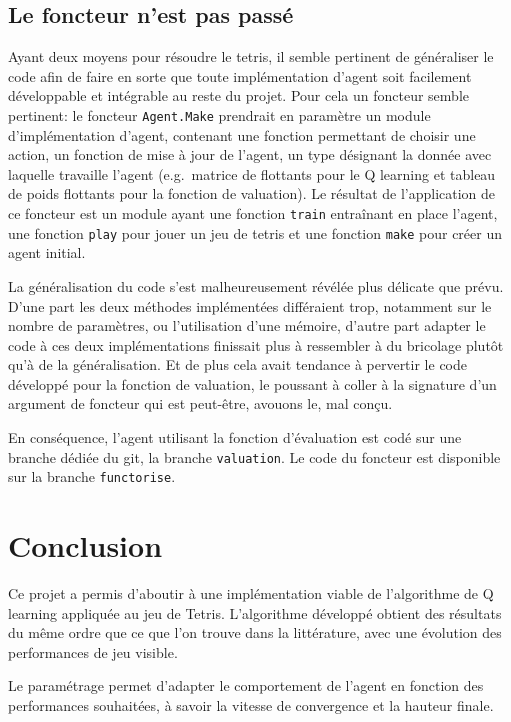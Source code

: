\documentclass{report}
\begin{document}
\section{Le foncteur n'est pas passé}
Ayant deux moyens pour résoudre le tetris, il semble pertinent de
généraliser le code afin de faire en sorte que toute implémentation
d'agent soit facilement développable et intégrable au reste du projet. Pour
cela un foncteur semble pertinent: le foncteur \texttt{Agent.Make} prendrait en
paramètre un module d'implémentation d'agent, contenant une fonction
permettant de choisir une action, un fonction de mise \`a jour de l'agent, un
type d\'esignant la donnée avec laquelle travaille l'agent (e.g.\ matrice de
flottants pour le Q learning et tableau de poids flottants pour la fonction de
valuation). Le r\'esultat de l'application de ce foncteur est un module ayant
une fonction \texttt{train} entra\^inant en place l'agent, une fonction
\texttt{play} pour jouer un jeu de tetris et une fonction \texttt{make} pour
cr\'eer un agent initial.

La généralisation du code s'est malheureusement révélée plus
délicate que prévu. D'une part les deux méthodes implémentées
différaient trop, notamment sur le nombre de paramètres, ou
l'utilisation d'une mémoire, d'autre part adapter le code \`a ces deux
implémentations finissait plus \`a ressembler \`a du bricolage plutôt qu'\`a
de la généralisation. Et de plus cela avait tendance \`a pervertir le code
développé pour la fonction de valuation, le poussant \`a coller \`a la
signature d'un argument de foncteur qui est peut-être, avouons le, mal conçu.

En conséquence, l'agent utilisant la fonction d'évaluation est codé sur
une branche dédiée du git, la branche \texttt{valuation}. Le code du
foncteur est disponible sur la branche \texttt{functorise}.
\chapter*{Conclusion}
Ce projet a permis d'aboutir à une implémentation viable de l'algorithme de Q
learning appliquée au jeu de Tetris. L'algorithme développé obtient des
résultats du même ordre que ce que l'on trouve dans la littérature\cite{melax},
avec une évolution des performances de jeu visible.

Le paramétrage permet d'adapter le comportement de l'agent en fonction des
performances souhaitées, à savoir la vitesse de convergence et la hauteur
finale.
\end{document}
